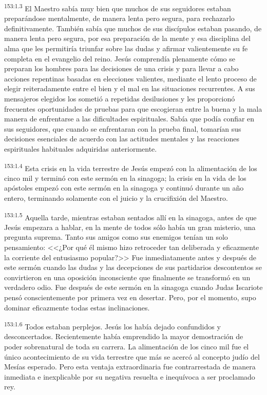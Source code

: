 \par 
\textsuperscript{153:1.3} El Maestro sabía muy bien que muchos de sus seguidores estaban preparándose mentalmente, de manera lenta pero segura, para rechazarlo definitivamente. También sabía que muchos de sus discípulos estaban pasando, de manera lenta pero segura, por esa preparación de la mente y esa disciplina del alma que les permitiría triunfar sobre las dudas y afirmar valientemente su fe completa en el evangelio del reino. Jesús comprendía plenamente cómo se preparan los hombres para las decisiones de una crisis y para llevar a cabo acciones repentinas basadas en elecciones valientes, mediante el lento proceso de elegir reiteradamente entre el bien y el mal en las situaciones recurrentes. A sus mensajeros elegidos los sometió a repetidas desilusiones y les proporcionó frecuentes oportunidades de pruebas para que escogieran entre la buena y la mala manera de enfrentarse a las dificultades espirituales. Sabía que podía confiar en sus seguidores, que cuando se enfrentaran con la prueba final, tomarían sus decisiones esenciales de acuerdo con las actitudes mentales y las reacciones espirituales habituales adquiridas anteriormente.

\par 
\textsuperscript{153:1.4} Esta crisis en la vida terrestre de Jesús empezó con la alimentación de los cinco mil y terminó con este sermón en la sinagoga; la crisis en la vida de los apóstoles empezó con este sermón en la sinagoga y continuó durante un año entero, terminando solamente con el juicio y la crucifixión del Maestro.

\par 
\textsuperscript{153:1.5} Aquella tarde, mientras estaban sentados allí en la sinagoga, antes de que Jesús empezara a hablar, en la mente de todos sólo había un gran misterio, una pregunta suprema. Tanto sus amigos como sus enemigos tenían un solo pensamiento: <<¿Por qué él mismo hizo retroceder tan deliberada y eficazmente la corriente del entusiasmo popular?>> Fue inmediatamente antes y después de este sermón cuando las dudas y las decepciones de sus partidarios descontentos se convirtieron en una oposición inconsciente que finalmente se transformó en un verdadero odio. Fue después de este sermón en la sinagoga cuando Judas Iscariote pensó conscientemente por primera vez en desertar. Pero, por el momento, supo dominar eficazmente todas estas inclinaciones.

\par 
\textsuperscript{153:1.6} Todos estaban perplejos. Jesús los había dejado confundidos y desconcertados. Recientemente había emprendido la mayor demostración de poder sobrenatural de toda su carrera. La alimentación de los cinco mil fue el único acontecimiento de su vida terrestre que más se acercó al concepto judío del Mesías esperado. Pero esta ventaja extraordinaria fue contrarrestada de manera inmediata e inexplicable por su negativa resuelta e inequívoca a ser proclamado rey.

